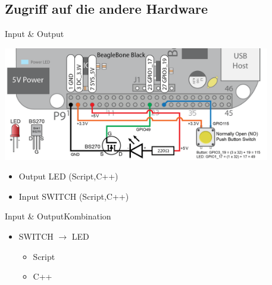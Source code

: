 \subsection{Zugriff auf die andere Hardware}

\begin{frame}{Input \& Output}
 \begin{center}
  \includegraphics[width=0.875\textwidth]{Button-and-LED-large.png}
 \end{center}
 \begin{itemize}
  \item Output LED (Script,C++)
  \item Input SWITCH (Script,C++)
 \end{itemize}
\end{frame}

\begin{frame}{Input \& Output}{Kombination}
 \begin{itemize}
  \item SWITCH $\to$ LED
  \begin{itemize}
   \item Script
   \item C++
  \end{itemize}
 \end{itemize}
\end{frame}

